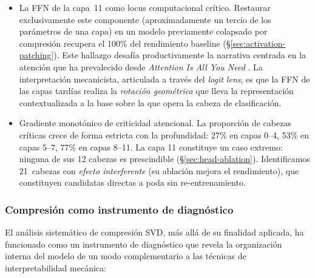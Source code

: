 \begin{itemize}
  \item La FFN de la capa~11 como locus computacional crítico.
        Restaurar exclusivamente este componente (aproximadamente un tercio
        de los parámetros de una capa) en un modelo previamente colapsado
        por compresión recupera el 100\% del rendimiento baseline
        (\S\ref{sec:activation-patching}). Este hallazgo desafía
        productivamente la narrativa centrada en la atención que ha
        prevalecido desde \emph{Attention Is All You Need}
        \cite{vaswani2017attention}. La interpretación mecanicista, articulada
        a través del \emph{logit lens}, es que la FFN de las capas tardías realiza
        la \emph{rotación geométrica} que lleva la representación
        contextualizada a la base sobre la que opera la cabeza de
        clasificación.

  \item Gradiente monotónico de criticidad atencional. La proporción
        de cabezas críticas crece de forma estricta con la profundidad: 27\%
        en capas 0--4, 53\% en capas 5--7, 77\% en capas 8--11. La capa 11
        constituye un caso extremo: ninguna de sus 12 cabezas es prescindible
        (\S\ref{sec:head-ablation}). Identificamos 21~cabezas con
        \emph{efecto interferente} (su ablación mejora el rendimiento), que
        constituyen candidatas directas a poda sin re-entrenamiento.
\end{itemize}


\subsubsection{Compresión como instrumento de diagnóstico}

El análisis sistemático de compresión SVD, más allá de su finalidad aplicada,
ha funcionado como un instrumento de diagnóstico que revela la organización
interna del modelo de un modo complementario a las técnicas de
interpretabilidad mecánica:

